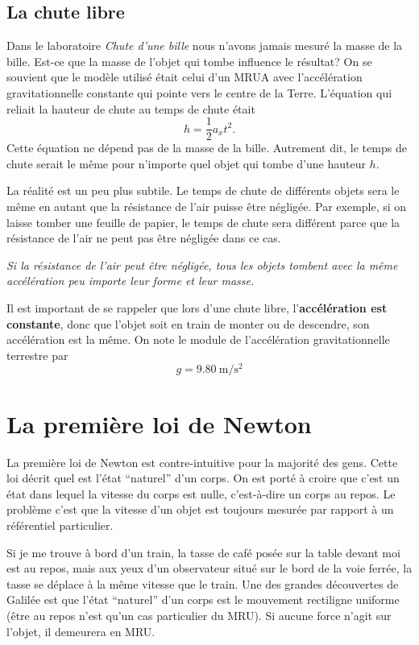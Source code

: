 \subsection{La chute libre}

Dans le laboratoire \textit{Chute d'une bille} nous n'avons jamais mesuré la
masse de la bille.  Est-ce que la masse de l'objet qui tombe influence le
résultat?  On se souvient que le modèle utilisé était celui d'un MRUA avec
l'accélération gravitationnelle constante qui pointe vers le centre de la
Terre.  L'équation qui reliait la hauteur de chute au temps de chute était
\[
  h = \frac{1}{2} a_x t^2.
\]
Cette équation ne dépend pas de la masse de la bille.  Autrement dit, le temps
de chute serait le même pour n'importe quel objet qui tombe d'une hauteur $h$.

La réalité est un peu plus subtile.  Le temps de chute de différents objets
sera le même en autant que la résistance de l'air puisse être négligée.  Par
exemple, si on laisse tomber une feuille de papier, le temps de chute sera
différent parce que la résistance de l'air ne peut pas être négligée dans ce
cas.

\textit{Si la résistance de l'air peut être négligée, tous les objets tombent
  avec la même accélération peu importe leur forme et leur masse.}

Il est important de se rappeler que lors d'une chute libre,
l'\textbf{accélération est constante}, donc que l'objet soit en train de
monter ou de descendre, son accélération est la même.  On note le module de
l'accélération gravitationnelle terrestre par
\[
  g = \SI{9.80}{\meter\per\second\squared}
\]



\section{La première loi de Newton}

La première loi de Newton est contre-intuitive pour la majorité des gens.
Cette loi décrit quel est l'état ``naturel'' d'un corps.  On est porté à croire
que c'est un état dans lequel la vitesse du corps est nulle, c'est-à-dire un
corps au repos.  Le problème c'est que la vitesse d'un objet est toujours
mesurée par rapport à un référentiel particulier.

Si je me trouve à bord d'un train, la tasse de café posée sur la table devant
moi est au repos, mais aux yeux d'un observateur situé sur le bord de la voie
ferrée, la tasse se déplace à la même vitesse que le train.  Une des grandes
découvertes de Galilée est que l'état ``naturel'' d'un corps est le mouvement
rectiligne uniforme (être au repos n'est qu'un cas particulier du MRU).  Si
aucune force n'agit sur l'objet, il demeurera en MRU.

